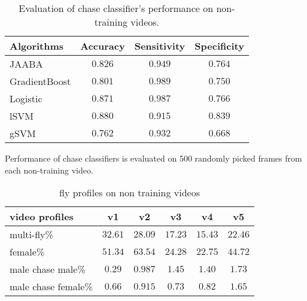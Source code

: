 \documentclass[11pt]{article}
\begin{document}
\begin{table}[ht]
\centering
\caption{Evaluation of chase classifier's performance on non-training videos.}

\label{chaseGT}
\begin{tabular}{lccc}
	\hline
	Algorithms  &  Accuracy   &  Sensitivity  &  Specificity \\ 
	\hline
	JAABA  & $0.826$ & $0.949 $ & $0.764$ \\
	GradientBoost& $0.801$ & $0.989 $ & $0.750$  \\
	 Logistic& $0.871$ & $ 0.987$ & $0.766 $  \\	
	 lSVM& $0.880$ & $ 0.915$ & $ 0.839$  \\
	 gSVM& $0.762$ & $ 0.932$ & $0.668 $  \\
	\hline
	
\end{tabular}
\vspace*{-0.15in}
\end{table}

Performance of chase classifiers is evaluated on 500 randomly picked frames from each non-training video. 

\begin{table}[ht]
\centering
\caption{fly profiles on non training videos}

\label{flyProfiles}
\begin{tabular}{lccccc}
	\hline
	video profiles  &  v1   &  v2  &  v3  &v4 &v5\\ 
	\hline
	multi-fly\%  & $32.61$ & $28.09 $ & $17.23$  &$15.43$&$22.46$\\
	female\%& $51.34$ & $63.54 $ & $24.28$ &$22.75$&$44.72$ \\
	 male chase male\%& $0.29$ & $ 0.987$ & $1.45 $ &$1.40$ &$1.73$\\	
	 male chase female\%& $0.66$ & $ 0.915$ & $ 0.73$  &$0.82$&$1.65$\\
	\hline
	
\end{tabular}
\vspace*{-0.15in}
\end{table}
\end{document}
